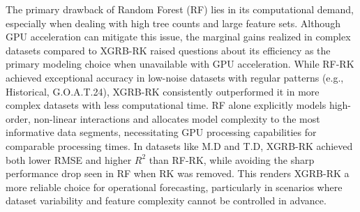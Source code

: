 The primary drawback of Random Forest (RF) lies in its computational demand, especially when dealing with high tree counts and large feature sets. Although GPU acceleration can mitigate this issue, the marginal gains realized in complex datasets compared to XGRB-RK raised questions about its efficiency as the primary modeling choice when unavailable with GPU acceleration. While RF-RK achieved exceptional accuracy in low-noise datasets with regular patterns (e.g., Historical, G.O.A.T.24), XGRB-RK consistently outperformed it in more complex datasets with less computational time. RF alone explicitly models high-order, non-linear interactions and allocates model complexity to the most informative data segments, necessitating GPU processing capabilities for comparable processing times. In datasets like M.D and T.D, XGRB-RK achieved both lower RMSE and higher $R^{2}$ than RF-RK, while avoiding the sharp performance drop seen in RF when RK was removed. This renders XGRB-RK a more reliable choice for operational forecasting, particularly in scenarios where dataset variability and feature complexity cannot be controlled in advance.
